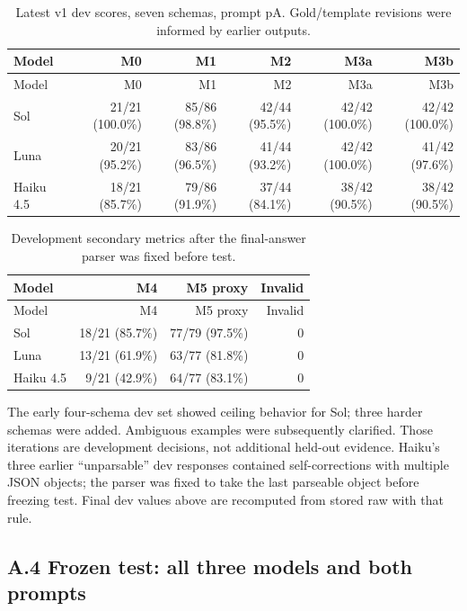 \begingroup\small\setlength{\tabcolsep}{4pt}
\begin{longtable}{lrrrrr}
\caption{Latest v1 dev scores, seven schemas, prompt pA. Gold/template revisions were informed by earlier outputs.}\\
\toprule
Model & M0 & M1 & M2 & M3a & M3b \\
\midrule\endfirsthead
\toprule
Model & M0 & M1 & M2 & M3a & M3b \\
\midrule\endhead
\bottomrule\endfoot
Sol & 21/21 (100.0\%) & 85/86 (98.8\%) & 42/44 (95.5\%) & 42/42 (100.0\%) & 42/42 (100.0\%) \\
Luna & 20/21 (95.2\%) & 83/86 (96.5\%) & 41/44 (93.2\%) & 42/42 (100.0\%) & 41/42 (97.6\%) \\
Haiku 4.5 & 18/21 (85.7\%) & 79/86 (91.9\%) & 37/44 (84.1\%) & 38/42 (90.5\%) & 38/42 (90.5\%) \\
\end{longtable}\endgroup


\begingroup\small\setlength{\tabcolsep}{4pt}
\begin{longtable}{lrrr}
\caption{Development secondary metrics after the final-answer parser was fixed before test.}\\
\toprule
Model & M4 & M5 proxy & Invalid \\
\midrule\endfirsthead
\toprule
Model & M4 & M5 proxy & Invalid \\
\midrule\endhead
\bottomrule\endfoot
Sol & 18/21 (85.7\%) & 77/79 (97.5\%) & 0 \\
Luna & 13/21 (61.9\%) & 63/77 (81.8\%) & 0 \\
Haiku 4.5 & 9/21 (42.9\%) & 64/77 (83.1\%) & 0 \\
\end{longtable}\endgroup


The early four-schema dev set showed ceiling behavior for Sol; three harder schemas were added. Ambiguous examples were subsequently clarified. Those iterations are development decisions, not additional held-out evidence. Haiku's three earlier ``unparsable'' dev responses contained self-corrections with multiple JSON objects; the parser was fixed to take the last parseable object before freezing test. Final dev values above are recomputed from stored raw with that rule.

\subsection*{A.4 Frozen test: all three models and both prompts}

